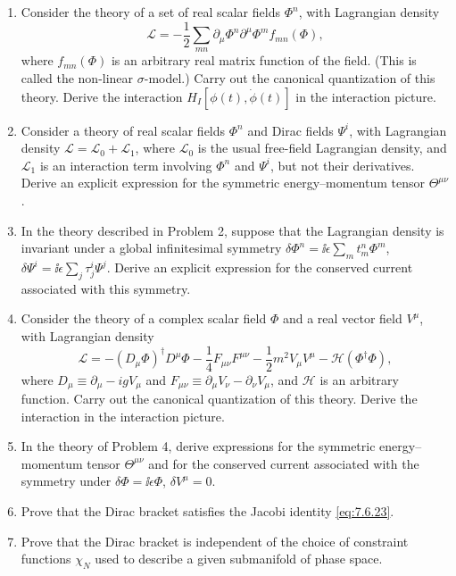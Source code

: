 

\begin{enumerate}
\item Consider the theory of a set of real scalar fields $\Phi^n$, with
Lagrangian density
\[
  \mathcal{L}=-\frac12\sum_{mn}\partial_\mu\Phi^n\partial^\mu\Phi^m
  f_{mn}(\Phi),
\]
where $f_{mn}(\Phi)$ is an arbitrary real matrix function of the field. (This
is called the non-linear $\sigma$-model.) Carry out the canonical quantization
of this theory. Derive the interaction
$H_I[\phi(t),\dot\phi(t)]$ in the interaction picture.

\item Consider a theory of real scalar fields $\Phi^n$ and Dirac fields
$\Psi^i$, with Lagrangian density $\mathcal{L}=\mathcal{L}_0+\mathcal{L}_1$,
where $\mathcal{L}_0$ is the usual free-field Lagrangian density, and
$\mathcal{L}_1$ is an interaction term involving $\Phi^n$ and $\Psi^i$,
but not their derivatives. Derive an explicit expression for the symmetric
energy--momentum tensor $\Theta^{\mu\nu}$.

\item In the theory described in Problem 2, suppose that the Lagrangian
density is invariant under a global infinitesimal symmetry
$\delta\Phi^n=\ii\epsilon\sum_m t^n_m\Phi^m$,
$\delta\Psi^i=\ii\epsilon\sum_j\tau^i_j\Psi^j$. Derive an explicit expression
for the conserved current associated with this symmetry.

\item Consider the theory of a complex scalar field $\Phi$ and a real vector
field $V^\mu$, with Lagrangian density
\[
  \mathcal{L}=-(D_\mu\Phi)^\dagger D^\mu\Phi
  -\frac14F_{\mu\nu}F^{\mu\nu}
  -\frac12m^2V_\mu V^\mu-\mathcal{H}(\Phi^\dagger\Phi),
\]
where $D_\mu\equiv\partial_\mu-igV_\mu$ and
$F_{\mu\nu}\equiv\partial_\mu V_\nu-\partial_\nu V_\mu$, and $\mathcal{H}$
is an arbitrary function. Carry out the canonical quantization of this
theory. Derive the interaction in the interaction picture.

\item In the theory of Problem 4, derive expressions for the symmetric
energy--momentum tensor $\Theta^{\mu\nu}$ and for the conserved current
associated with the symmetry under $\delta\Phi=\ii\epsilon\Phi$,
$\delta V^\mu=0$.

\item Prove that the Dirac bracket satisfies the Jacobi identity \eqref{eq:7.6.23}.

\item Prove that the Dirac bracket is independent of the choice of constraint
functions $\chi_N$ used to describe a given submanifold of phase space.
\end{enumerate}

